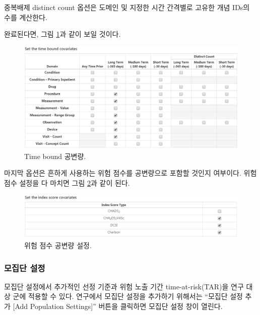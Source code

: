 \documentclass[10.5pt]{book}
\theoremstyle{definition}
\theoremstyle{definition}
\theoremstyle{definition}
\theoremstyle{remark}
\begin{document}
중복배제 distinct count 옵션은 도메인 및 지정한 시간 간격별로 고유한
개념 IDs의 수를 계산한다.

완료된다면, 그림 \ref{fig:covariateSettings5}과 같이 보일 것이다.

\begin{figure}

{\centering \includegraphics[width=1\linewidth]{images/PatientLevelPrediction/covariateSettings5} 

}

\caption{Time bound 공변량.}\label{fig:covariateSettings5}
\end{figure}

마지막 옵션은 흔하게 사용하는 위험 점수를 공변량으로 포함할 것인지
여부이다. 위험점수 설정을 다 마치면 그림 \ref{fig:covariateSettings6}과
같이 된다.

\begin{figure}

{\centering \includegraphics[width=1\linewidth]{images/PatientLevelPrediction/covariateSettings6} 

}

\caption{위험 점수 공변량 설정.}\label{fig:covariateSettings6}
\end{figure}

\subsubsection*{모집단 설정}\label{-}

모집단 설정에서 추가적인 선정 기준과 위험 노출 기간 time-at-risk(TAR)을
연구 대상 군에 적용할 수 있다. 연구에서 모집단 설정을 추가하기 위해서는
``모집단 설정 추가 {[}Add Population Settings{]}'' 버튼을 클릭하면
모집단 설정 창이 열린다.
\end{document}
